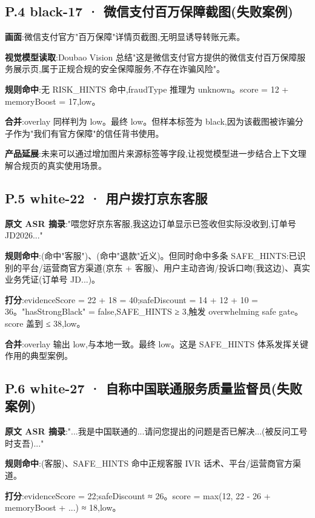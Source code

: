 \documentclass[UTF8,a4paper,12pt]{ctexart}
\newcommand{\codepath}[1]{\seqsplit{#1}}
\begin{document}
\subsection*{P.4 black-17 · 微信支付百万保障截图(失败案例)}

\textbf{画面}:微信支付官方"百万保障"详情页截图,无明显诱导转账元素。

\textbf{视觉模型读取}:Doubao Vision 总结"这是微信支付官方提供的微信支付百万保障服务展示页,属于正规合规的安全保障服务,不存在诈骗风险"。

\textbf{规则命中}:无 RISK\_HINTS 命中,fraudType 推理为 unknown。score = 12 + memoryBoost = 17,low。

\textbf{合并}:overlay 同样判为 low。最终 low。但样本标签为 black,因为该截图被诈骗分子作为"我们有官方保障"的信任背书使用。

\textbf{产品延展}:未来可以通过增加图片来源标签等字段,让视觉模型进一步结合上下文理解合规页的真实使用场景。

\subsection*{P.5 white-22 · 用户拨打京东客服}

\textbf{原文 ASR 摘录}:"喂您好京东客服,我这边订单显示已签收但实际没收到,订单号 JD2026..."

\textbf{规则命中}:\codepath{客服退款诱导}(命中"客服")、\codepath{资金操作要求}(命中"退款"近义)。但同时命中多条 SAFE\_HINTS:已识别的平台/运营商官方渠道(京东 + 客服)、用户主动咨询/投诉口吻(我这边)、真实业务凭证(订单号 JD...)。

\textbf{打分}:evidenceScore = 22 + 18 = 40;safeDiscount = 14 + 12 + 10 = 36。"hasStrongBlack" = false,SAFE\_HINTS ≥ 3,触发 overwhelming safe gate。score 盖到 ≤ 38,low。

\textbf{合并}:overlay 输出 low,与本地一致。最终 low。这是 SAFE\_HINTS 体系发挥关键作用的典型案例。

\subsection*{P.6 white-27 · 自称中国联通服务质量监督员(失败案例)}

\textbf{原文 ASR 摘录}:"...我是中国联通的...请问您提出的问题是否已解决...(被反问工号时支吾)..."

\textbf{规则命中}:\codepath{客服退款诱导}(客服)、SAFE\_HINTS 命中正规客服 IVR 话术、平台/运营商官方渠道。

\textbf{打分}:evidenceScore = 22;safeDiscount ≈ 26。score = max(12, 22 - 26 + memoryBoost + ...) ≈ 18,low。
\end{document}
